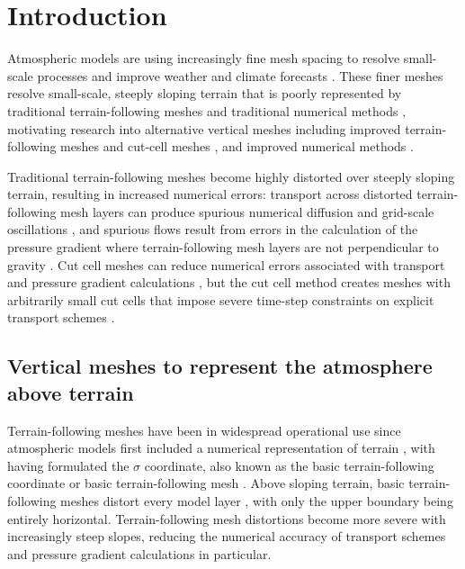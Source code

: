 \chapter{Introduction}

Atmospheric models are using increasingly fine mesh spacing to resolve small-scale processes and improve weather and climate forecasts \citep{wedi2014}.
These finer meshes resolve small-scale, steeply sloping terrain that is poorly represented by traditional terrain-following meshes and traditional numerical methods \citep{schaer2002}, motivating research into alternative vertical meshes including improved terrain-following meshes \citep{schaer2002,klemp2011} and cut-cell meshes \citep{jaehn2015,yamazaki2016}, and improved numerical methods \citep{zaengl2012,steppeler-klemp2017}.

Traditional terrain-following meshes become highly distorted over steeply sloping terrain, resulting in increased numerical errors: transport across distorted terrain-following mesh layers can produce spurious numerical diffusion and grid-scale oscillations \citep{hoinka-zaengl2004,schaer2002}, and spurious flows result from errors in the calculation of the pressure gradient where terrain-following mesh layers are not perpendicular to gravity \citep{klemp2011,zaengl2012}.
Cut cell meshes can reduce numerical errors associated with transport and pressure gradient calculations \citep{good2014}, but the cut cell method creates meshes with arbitrarily small cut cells that impose severe time-step constraints on explicit transport schemes \citep{klein2009}.

\section{Vertical meshes to represent the atmosphere above terrain}

Terrain-following meshes have been in widespread operational use since atmospheric models first included a numerical representation of terrain \citep{steppeler2003}, with \citet{phillips1957} having formulated the $\sigma$ coordinate, also known as the basic terrain-following coordinate or basic terrain-following mesh \citep{galchen-somerville1975a}.
Above sloping terrain, basic terrain-following meshes distort every model layer , with only the upper boundary being entirely horizontal.
Terrain-following mesh distortions become more severe with increasingly steep slopes, reducing the numerical accuracy of transport schemes and pressure gradient calculations in particular.

